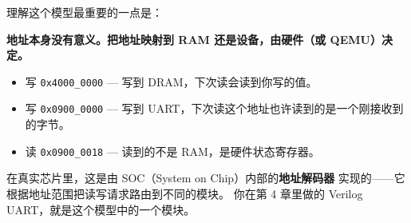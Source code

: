 理解这个模型最重要的一点是：

\begin{center}
\textbf{地址本身没有意义。把地址映射到 RAM 还是设备，由硬件（或 QEMU）决定。}
\end{center}

\begin{itemize}
    \item 写 \texttt{0x4000\_0000} — 写到 DRAM，下次读会读到你写的值。
    \item 写 \texttt{0x0900\_0000} — 写到 UART，下次读这个地址也许读到的是一个刚接收到的字节。
    \item 读 \texttt{0x0900\_0018} — 读到的不是 RAM，是硬件状态寄存器。
\end{itemize}

在真实芯片里，这是由 SOC（System on Chip）内部的\textbf{地址解码器}
实现的——它根据地址范围把读写请求路由到不同的模块。
你在第 4 章里做的 Verilog UART，就是这个模型中的一个模块。
